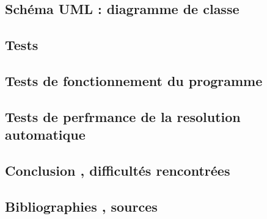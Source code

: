 \documentclass{article}
\begin{document}
\newpage
\begin{center}
	\section{Schéma UML : diagramme de classe}
\end{center}

\newpage
\begin{center}
	\section{Tests}
		\subsection{Tests de fonctionnement du programme}
		\subsection{Tests de perfrmance de la resolution automatique}
\end{center}

\newpage
\begin{center}
	\section{Conclusion , difficultés rencontrées}
\end{center}

\newpage
\begin{center}
	\section{Bibliographies , sources}
\end{center}
\end{document}
